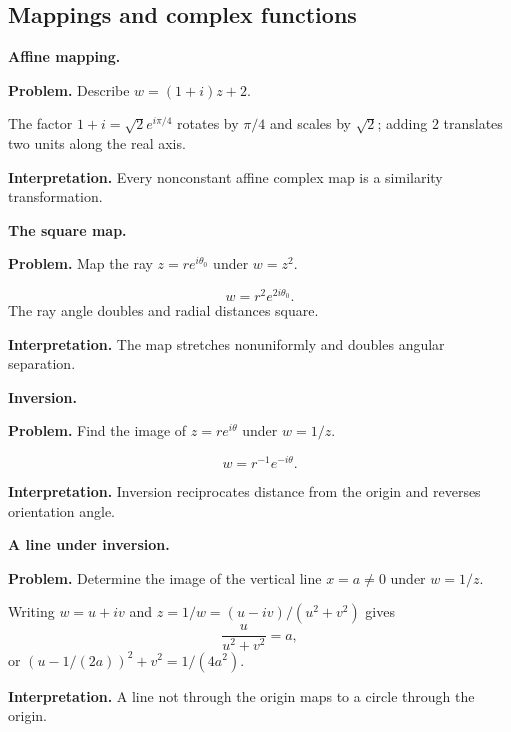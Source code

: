 \subsection{Mappings and complex functions}

\begin{workedexample}
\textbf{Affine mapping.}\par
\textbf{Problem.} Describe $w=(1+i)z+2$.
\begin{solution}
The factor $1+i=\sqrt2e^{i\pi/4}$ rotates by $\pi/4$ and scales by $\sqrt2$; adding $2$ translates two units along the real axis.

\textbf{Interpretation.} Every nonconstant affine complex map is a similarity transformation.
\end{solution}
\end{workedexample}

\begin{workedexample}
\textbf{The square map.}\par
\textbf{Problem.} Map the ray $z=re^{i\theta_0}$ under $w=z^2$.
\begin{solution}
\[
w=r^2e^{2i\theta_0}.
\]
The ray angle doubles and radial distances square.

\textbf{Interpretation.} The map stretches nonuniformly and doubles angular separation.
\end{solution}
\end{workedexample}

\begin{workedexample}
\textbf{Inversion.}\par
\textbf{Problem.} Find the image of $z=re^{i\theta}$ under $w=1/z$.
\begin{solution}
\[
w=r^{-1}e^{-i\theta}.
\]

\textbf{Interpretation.} Inversion reciprocates distance from the origin and reverses orientation angle.
\end{solution}
\end{workedexample}

\begin{workedexample}
\textbf{A line under inversion.}\par
\textbf{Problem.} Determine the image of the vertical line $x=a\neq0$ under $w=1/z$.
\begin{solution}
Writing $w=u+iv$ and $z=1/w=(u-iv)/(u^2+v^2)$ gives
\[
\frac{u}{u^2+v^2}=a,
\]
or $(u-1/(2a))^2+v^2=1/(4a^2)$.

\textbf{Interpretation.} A line not through the origin maps to a circle through the origin.
\end{solution}
\end{workedexample}

